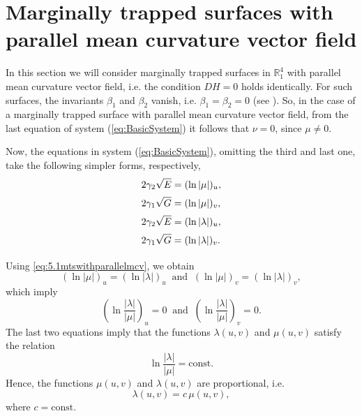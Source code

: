 \documentclass[12pt]{amsart}
\newcommand{\R}{\mathbb R}
\newcommand{\const}{\mathrm{const}}
\theoremstyle{definition}
\theoremstyle{remark}
\newcommand{\ds}{\displaystyle}
\numberwithin{equation}{section}
\begin{document}
\section{Marginally trapped surfaces with parallel mean curvature vector field}

In this section we will consider marginally trapped surfaces in $\R^4_1$ with  parallel mean curvature vector field, i.e. the condition $DH =0$ holds identically. For such surfaces, the invariants $\beta_1$ and $\beta_2$ vanish, i.e. $\beta_1=\beta_2=0$ (see \cite{G-M-JMP-2012}). So, in the case of a marginally trapped surface with parallel mean curvature vector field, 
from the last equation of system (\ref{eq:BasicSystem}) it follows that $\nu=0$, since $\mu \neq  0$. 


Now, the equations in system (\ref{eq:BasicSystem}), omitting the third and last one, take the following simpler forms, respectively,
\begin{equation}\label{eq:5.1mtswithparallelmcv}
	\begin{array}{l}
		\vspace{2mm}
		\ds 2\gamma_2\sqrt{E}= (\ln|\mu|)_u, \\
		\vspace{2mm}
		\ds	2\gamma_1\sqrt{G}=(\ln|\mu|)_v, \\
		\vspace{2mm} 
		\ds 2\gamma_2\sqrt{E}=(\ln|\lambda|)_u, \\
		\vspace{2mm}
		\ds	2\gamma_1\sqrt{G}=(\ln|\lambda|)_v.
	\end{array}
\end{equation}
Using \eqref{eq:5.1mtswithparallelmcv}, we obtain
\begin{equation*}
	(\ln|\mu|)_u = (\ln|\lambda|)_u\;\; \mbox{and} \;\;  (\ln|\mu|)_v = (\ln|\lambda|)_v,
\end{equation*}
which imply 
\begin{equation*}
	\left(\ln{\frac{|\lambda|}{|\mu|}}\right)_u=0 \;\; \mbox{and} \;\; \left(\ln{\frac{|\lambda|}{|\mu|}}\right)_v=0.
\end{equation*}
The last two equations imply that the functions $\lambda(u,v)$  and  $\mu(u,v)$ satisfy the relation
\begin{equation*}
	\ln{\frac{|\lambda|}{|\mu|}}= \const.
\end{equation*}
Hence, the functions $\mu(u,v)$ and $\lambda(u,v)$ are proportional, i.e. 
\begin{equation}\label{eq:mulambda}
	\lambda(u,v) = c\, \mu(u,v),
\end{equation}
where $c = \const$.
\end{document}
